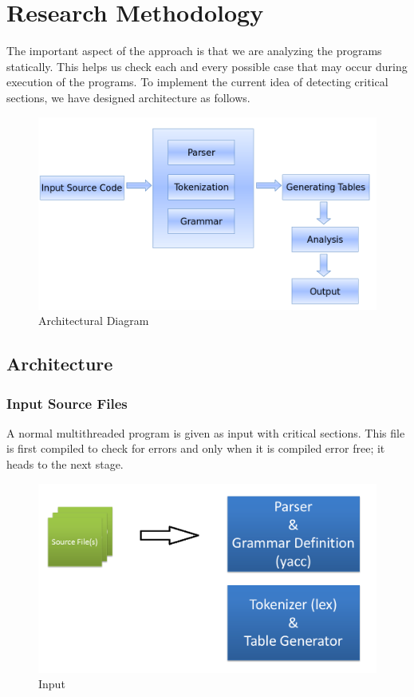 \chapter{Research Methodology}

The important aspect of the approach is that we are analyzing the programs statically. This helps us check each and every possible case that may occur during execution of the programs. To implement the current idea of detecting critical sections, we have designed architecture as follows.


\begin{figure}[H]
\centering
\includegraphics[scale=0.4]{architecture.png}
\caption{Architectural Diagram}
\label{<<Label>>}
\end{figure}

\section{Architecture}

\subsection{Input Source Files}
A normal multithreaded program is given as input with critical sections. This file is first compiled to check for errors and only when it is compiled error free; it heads to the next stage.
\begin{figure}[H]
\centering
\includegraphics[scale=0.4]{input.png}
\caption{Input}
\label{<<Label>>}
\end{figure}


